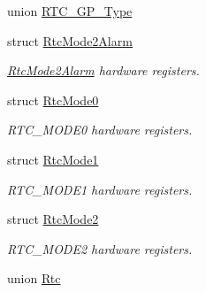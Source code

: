 \begin{DoxyCompactItemize}
\item 
union \hyperlink{union_r_t_c___g_p___type}{R\+T\+C\+\_\+\+G\+P\+\_\+\+Type}
\item 
struct \hyperlink{struct_rtc_mode2_alarm}{Rtc\+Mode2\+Alarm}
\begin{DoxyCompactList}\small\item\em \hyperlink{struct_rtc_mode2_alarm}{Rtc\+Mode2\+Alarm} hardware registers. \end{DoxyCompactList}\item 
struct \hyperlink{struct_rtc_mode0}{Rtc\+Mode0}
\begin{DoxyCompactList}\small\item\em R\+T\+C\+\_\+\+M\+O\+D\+E0 hardware registers. \end{DoxyCompactList}\item 
struct \hyperlink{struct_rtc_mode1}{Rtc\+Mode1}
\begin{DoxyCompactList}\small\item\em R\+T\+C\+\_\+\+M\+O\+D\+E1 hardware registers. \end{DoxyCompactList}\item 
struct \hyperlink{struct_rtc_mode2}{Rtc\+Mode2}
\begin{DoxyCompactList}\small\item\em R\+T\+C\+\_\+\+M\+O\+D\+E2 hardware registers. \end{DoxyCompactList}\item 
union \hyperlink{union_rtc}{Rtc}
\end{DoxyCompactItemize}
